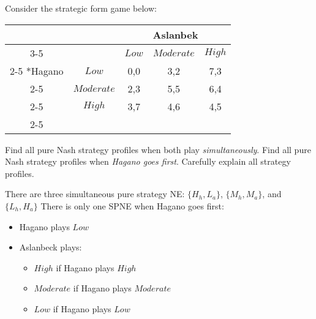 \documentclass{article}
\begin{document}
\begin{question}
Consider the strategic form game below:
\begin{table}[h!]
  \begin{center}
  \begin{tabular}{*{5}{c|}}
    \multicolumn{2}{c}{} & \multicolumn{3}{c}{Aslanbek} \\\cline{3-5}
    \multicolumn{1}{c}{} & & $Low$ & $Moderate$ & $High$ \\\cline{2-5}
    \multirow{3}*{Hagano}  & $Low$ & 0,0 & 3,2 & 7,3 \\\cline{2-5}
                         & $Moderate$ & 2,3 & 5,5 & 6,4 \\\cline{2-5}
                         & $High$ & 3,7 & 4,6 & 4,5 \\ \cline{2-5}
  \end{tabular}
  \end{center}
\end{table}
\begin{tasks}
  \task
  Find all pure Nash strategy profiles when both play \textit{simultaneously}.
  \task
  Find all pure Nash strategy profiles when \textit{Hagano goes first}.
  Carefully explain all strategy profiles.
\end{tasks}
\begin{solution}
  \begin{tasks}
    \task There are three simultaneous pure strategy NE:
    $\{H_h,L_a\}$, $\{M_h, M_a\}$, and $\{L_h,H_a\}$
    \task 
    There is only one SPNE when Hagano goes first:
    \begin{itemize}
      \item Hagano plays $Low$
      \item Aslanbeck plays:
      \begin{itemize}
        \item $High$ if Hagano plays $High$
        \item $Moderate$ if Hagano plays $Moderate$
        \item $Low$ if Hagano plays $Low$
      \end{itemize}
    \end{itemize}
  \end{tasks}
\end{solution}
\end{question}

\newpage

\end{document}
